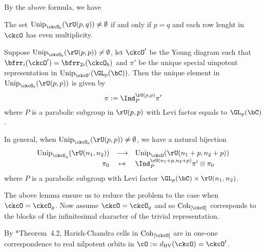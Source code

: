 \documentclass[counting_main.tex]{subfiles}
\begin{document}
By the above formula, we have
\begin{lem}
  \begin{enumT}
    \item
The set $\Unip_{\ckcO_b}(\rU(p,q))\neq \emptyset$ if and only if $p=q$ and
each row lenght in $\ckcO$ has even multiplicity.
\item
Suppose $\Unip_{\ckcO_b}(\rU(p,p))\neq \emptyset$, let $\ckcO'$ be the Young diagram
such that $\bfrr_i(\ckcO') = \bfrr_{2i}(\ckcO_b)$ and $\pi'$ be the unique special
uinpotent representation in $\Unip_{\ckcO'}(\GL_{p}(\bC))$.
Then the unique element in $\Unip_{\ckcO_b}(\rU(p,p))$  is given by
\[
  \pi := \Ind_{P}^{\rU(p,p)} \pi'
\]
where $P$ is a parabolic subgroup in $\rU(p,p)$ with Levi factor equals
to $\GL_p(\bC)$.
\item
In general, when $\Unip_{\ckcO_b}(\rU(p,p))\neq \emptyset$, we have a natural bijection
\[
  \begin{array}{rcl}
  \Unip_{\ckcO_g}(\rU(n_1,n_2)) &\longrightarrow& \Unip_{\ckcO}(\rU(n_1+p,n_2+p))\\
  \pi_0 & \mapsto & \Ind_P^{\rU(n_1+p,n_2+p)} \pi'\otimes \pi_0
  \end{array}
\]
where $P$ is a parabolic subgroup with Levi factor $\GL_p(\bC)\times \rU(n_1,n_2)$.
  \end{enumT}
\end{lem}

The above lemma ensure us to reduce the problem to the case when $\ckcO = \ckcO_g$.
Now assume $\ckcO = \ckcO_g$ and so $\Cint{\ckcO}$ corresponds to the blocks of
the infinitesimal character of the trivial representation.

By \cite{BV.W}*{Theorem~4.2},  Harish-Chandra cells in $\Cint{\ckcO}$ are in one-one
correspondence to real nilpotent orbits in $\cO:=\dBV(\ckcO)=\ckcO^t$.

\end{document}
